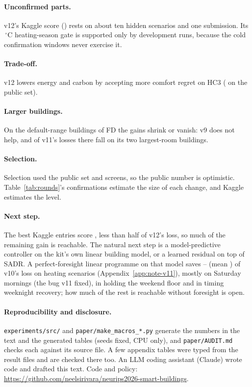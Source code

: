 \documentclass{article}
\begin{document}
\paragraph{Unconfirmed parts.} v12's Kaggle score (\RTenKagVTwelve) rests on about ten hidden scenarios and one submission. Its \RTenSeasonOatC\,$^\circ$C heating-season gate is supported only by development runs, because the cold confirmation windows never exercise it.

\paragraph{Trade-off.} v12 lowers energy and carbon by accepting \RTenComfRiseHCThree{} more comfort regret on HC3 (\RTenComfRisePub{} on the public set).

\paragraph{Larger buildings.} On the default-range buildings of FD the gains shrink or vanish: v9 does not help, and \RNineFDTopTwoLosses{} of v11's \RNineConfFreshDefLosses{} losses there fall on its two largest-room buildings.

\paragraph{Selection.} Selection used the public set and screens, so the public number is optimistic. Table~\ref{tab:rounds}'s confirmations estimate the size of each change, and Kaggle estimates the level.

\paragraph{Next step.} The best Kaggle entries score \RElvKagBest{}, less than half of v12's loss, so much of the remaining gain is reachable. The natural next step is a model-predictive controller on the kit's own linear building model, or a learned residual on top of SADR. A perfect-foresight linear programme on that model saves \RElvLpMin--\RElvLpMax{} (mean \RElvLpMean) of v10's loss on \RElvLpN{} heating scenarios (Appendix~\ref{app:note-v11}), mostly on Saturday mornings (the bug v11 fixed), in holding the weekend floor and in timing weeknight recovery; how much of the rest is reachable without foresight is open.

\paragraph{Reproducibility and disclosure.} \texttt{experiments/src/} and \texttt{paper/make\_macros\_*.py} generate the numbers in the text and the generated tables (seeds fixed, CPU only), and \texttt{paper/AUDIT.md} checks each against its source file. A few appendix tables were typed from the result files and are checked there too. An LLM coding assistant (Claude) wrote code and drafted this text. Code and policy: \url{https://github.com/neelsirivara/neurips2026-smart-buildings}.


\end{document}

